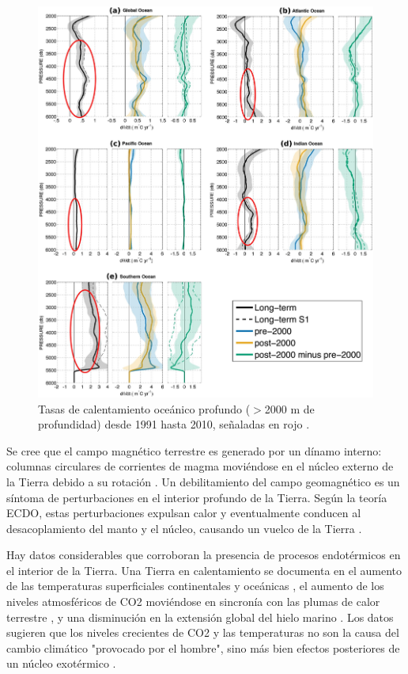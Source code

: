 \documentclass[10pt,twocolumn,letterpaper]{article}
\begin{document}
\begin{figure}[t]
\begin{center}
   \includegraphics[width=1\linewidth]{ocean-highlight.jpg}
\end{center}
   \caption{Tasas de calentamiento oceánico profundo ($>$2000 m de profundidad) desde 1991 hasta 2010, señaladas en rojo \cite{132}.}
\label{fig:15}
\label{fig:onecol}
\end{figure}

Se cree que el campo magnético terrestre es generado por un dínamo interno: columnas circulares de corrientes de magma moviéndose en el núcleo externo de la Tierra debido a su rotación \cite{123}. Un debilitamiento del campo geomagnético es un síntoma de perturbaciones en el interior profundo de la Tierra. Según la teoría ECDO, estas perturbaciones expulsan calor y eventualmente conducen al desacoplamiento del manto y el núcleo, causando un vuelco de la Tierra \cite{1}.

Hay datos considerables que corroboran la presencia de procesos endotérmicos en el interior de la Tierra. Una Tierra en calentamiento se documenta en el aumento de las temperaturas superficiales continentales y oceánicas \cite{127,128}, el aumento de los niveles atmosféricos de CO2 moviéndose en sincronía con las plumas de calor terrestre \cite{129,130}, y una disminución en la extensión global del hielo marino \cite{131}. Los datos sugieren que los niveles crecientes de CO2 y las temperaturas no son la causa del cambio climático "provocado por el hombre", sino más bien efectos posteriores de un núcleo exotérmico \cite{129}.
\end{document}
